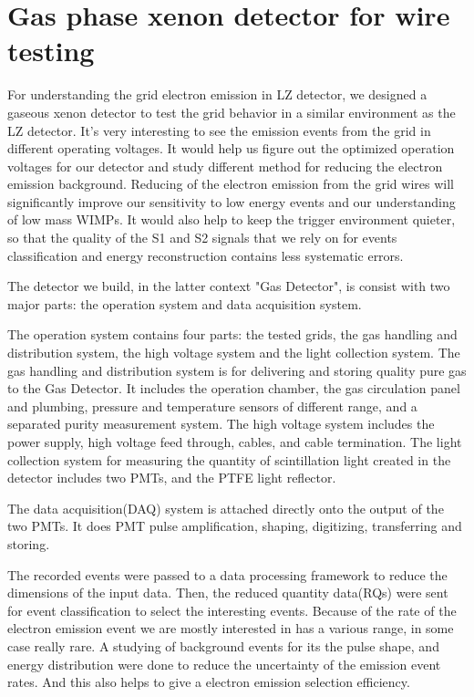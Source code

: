 \label{Chapter10}
\chapter{Gas phase xenon detector for wire testing}

For understanding the grid electron emission in LZ detector, we designed a gaseous xenon detector to test the grid behavior in a similar environment as the LZ detector. It's very interesting to see the emission events from the grid in different operating voltages. It would help us figure out the optimized operation voltages for our detector and study different method for reducing the electron emission background. Reducing of the electron emission from the grid wires will significantly improve our sensitivity to low energy events and our understanding of low mass WIMPs. It would also help to keep the trigger environment quieter, so that the quality of the S1 and S2 signals that we rely on for events classification and energy reconstruction contains less systematic errors. 

The detector we build, in the latter context "Gas Detector", is consist with two major parts: the operation system and data acquisition system. 

The operation system contains four parts: the tested grids, the gas handling and distribution system, the high voltage system and the light collection system. The gas handling and distribution system is for delivering and storing quality pure gas to the Gas Detector. It includes the operation chamber, the gas circulation panel and plumbing, pressure and temperature sensors of different range, and a separated purity measurement system. The high voltage system includes the power supply, high voltage feed through, cables, and cable termination. The light collection system for measuring the quantity of scintillation light created in the detector includes two PMTs, and the PTFE light reflector.

The data acquisition(DAQ) system is attached directly onto the output of the two PMTs. It does PMT pulse amplification, shaping, digitizing, transferring and storing.   

The recorded events were passed to a data processing framework to reduce the dimensions of the input data. Then, the reduced quantity data(RQs) were sent for event classification to select the interesting events. Because of the rate of the electron emission event we are mostly interested in has a various range, in some case really rare. A studying of background events for its the pulse shape, and energy distribution were done to reduce the uncertainty of the emission event rates. And this also helps to give a electron emission selection efficiency. 


